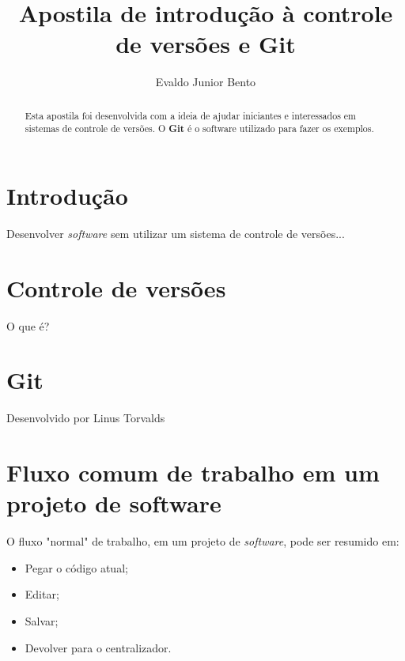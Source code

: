 \documentclass[12pt,a4paper]{report}
\begin{document}
\title{Apostila de introdução à controle de versões e Git}
\author{Evaldo Junior Bento}

\maketitle

\begin{abstract}
Esta apostila foi desenvolvida com a ideia de ajudar iniciantes e interessados
em sistemas de controle de versões. O \textbf{Git} é o software utilizado
para fazer os exemplos.
\end{abstract}

\tableofcontents

\section{Introdução}
Desenvolver \textit{software} sem utilizar um sistema de controle de versões...

\section{Controle de versões}
O que é?

\section{Git}
Desenvolvido por Linus Torvalds

\section{Fluxo comum de trabalho em um projeto de software}
    O fluxo "normal" de trabalho, em um projeto de \textit{software}, pode ser
    resumido em:
    \begin{itemize}
        \item Pegar o código atual;
        \item Editar;
        \item Salvar;
        \item Devolver para o centralizador.
    \end{itemize}
\end{document}
